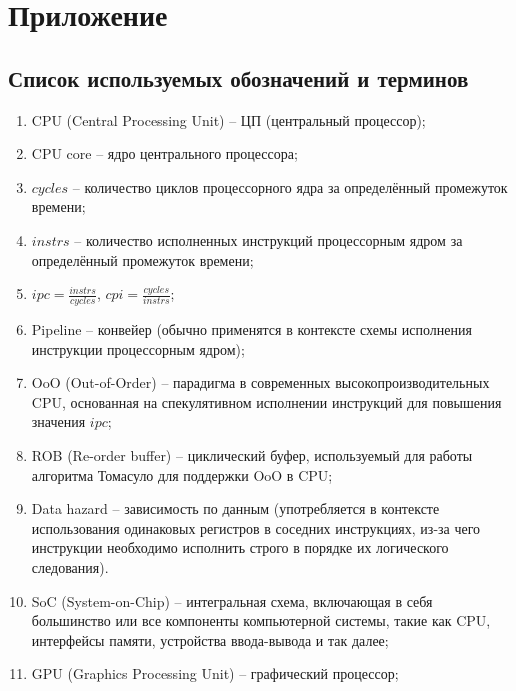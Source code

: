 \section*{Приложение}
\label{sec:Apendix} 

\subsection*{Список используемых обозначений и терминов}

\begin{enumerate}
    \item CPU (Central Processing Unit) -- ЦП (центральный процессор);
    \item CPU core -- ядро центрального процессора;
    \item $cycles$ -- количество циклов процессорного ядра за определённый промежуток времени;
    \item $instrs$ -- количество исполненных инструкций процессорным ядром за определённый
        промежуток времени;
    \item $ipc = \frac{instrs}{cycles}$, $cpi = \frac{cycles}{instrs}$;
    \item Pipeline -- конвейер (обычно применятся в контексте схемы исполнения инструкции
        процессорным ядром);
    \item OoO (Out-of-Order) -- парадигма в современных высокопроизводительных CPU, основанная
        на спекулятивном исполнении инструкций для повышения значения $ipc$;
    \item ROB (Re-order buffer) -- циклический буфер, используемый для работы алгоритма Томасуло
        для поддержки OoO в CPU;
    \item Data hazard -- зависимость по данным (употребляется в контексте использования
        одинаковых регистров в соседних инструкциях, из-за чего инструкции необходимо исполнить
        строго в порядке их логического следования).
    \item SoC (System-on-Chip) -- интегральная схема, включающая в себя большинство или все
        компоненты компьютерной системы, такие как CPU, интерфейсы памяти, устройства ввода-вывода
        и так далее;
    \item GPU (Graphics Processing Unit) -- графический процессор;


\end{enumerate}
